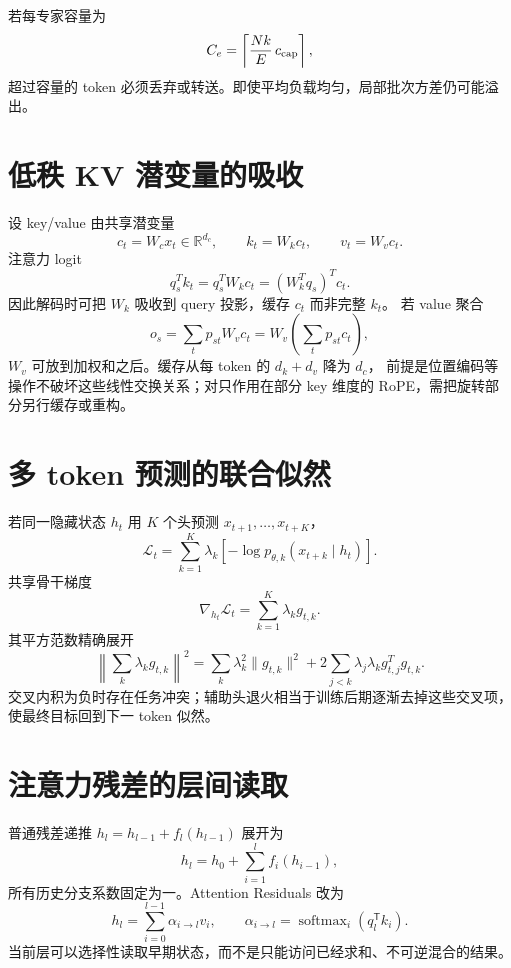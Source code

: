\documentclass[11pt]{article}
\numberwithin{equation}{section}
\newcommand{\R}{\mathbb{R}}
\newcommand{\1}{\mathbf{1}}
\newcommand{\T}{\mathsf{T}}
\newcommand{\cL}{\mathcal{L}}
\newcommand{\softmax}{\operatorname{softmax}}
\begin{document}
若每专家容量为
\begin{equation}
 C_e=\left\lceil\frac{Nk}{E}\,c_{\rm cap}\right\rceil,
\end{equation}
超过容量的 token 必须丢弃或转送。即使平均负载均匀，局部批次方差仍可能溢出。

\section{低秩 KV 潜变量的吸收}

设 key/value 由共享潜变量
\begin{equation}
 c_t=W_cx_t\in\R^{d_c},\qquad
 k_t=W_kc_t,\qquad v_t=W_vc_t.
\end{equation}
注意力 logit
\begin{equation}
 q_s^Tk_t=q_s^TW_kc_t=(W_k^Tq_s)^Tc_t.
\end{equation}
因此解码时可把 $W_k$ 吸收到 query 投影，缓存 $c_t$ 而非完整 $k_t$。
若 value 聚合
\begin{equation}
 o_s=\sum_tp_{st}W_vc_t=W_v\left(\sum_tp_{st}c_t\right),
\end{equation}
$W_v$ 可放到加权和之后。缓存从每 token 的 $d_k+d_v$ 降为 $d_c$，
前提是位置编码等操作不破坏这些线性交换关系；对只作用在部分 key 维度的 RoPE，需把旋转部分另行缓存或重构。

\section{多 token 预测的联合似然}

若同一隐藏状态 $h_t$ 用 $K$ 个头预测 $x_{t+1},\ldots,x_{t+K}$，
\begin{equation}
 \cL_t=\sum_{k=1}^{K}\lambda_k
 [-\log p_{\theta,k}(x_{t+k}\mid h_t)].
\end{equation}
共享骨干梯度
\begin{equation}
 \nabla_{h_t}\cL_t=\sum_{k=1}^{K}\lambda_k g_{t,k}.
\end{equation}
其平方范数精确展开
\begin{equation}
 \left\|\sum_k\lambda_kg_{t,k}\right\|^2
 =\sum_k\lambda_k^2\|g_{t,k}\|^2
 +2\sum_{j<k}\lambda_j\lambda_k g_{t,j}^Tg_{t,k}.
\end{equation}
交叉内积为负时存在任务冲突；辅助头退火相当于训练后期逐渐去掉这些交叉项，
使最终目标回到下一 token 似然。

\section{注意力残差的层间读取}
普通残差递推 $h_l=h_{l-1}+f_l(h_{l-1})$ 展开为
\begin{equation}
  h_l=h_0+\sum_{i=1}^{l}f_i(h_{i-1}),
\end{equation}
所有历史分支系数固定为一。Attention Residuals 改为
\begin{equation}
  h_l=\sum_{i=0}^{l-1}\alpha_{i\to l}v_i,
  \qquad \alpha_{i\to l}=\softmax_i(q_l^{\T}k_i).
\end{equation}
当前层可以选择性读取早期状态，而不是只能访问已经求和、不可逆混合的结果。
\end{document}

